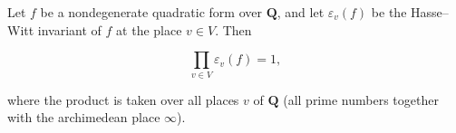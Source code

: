 Let $f$ be a nondegenerate quadratic form over $\mathbf{Q}$, and let $\varepsilon_v(f)$ be the Hasse–Witt invariant of $f$ at the place $v \in V$. Then

$$\prod_{v \in V} \varepsilon_v(f) = 1,$$

where the product is taken over all places $v$ of $\mathbf{Q}$ (all prime numbers together with the archimedean place $\infty$).
